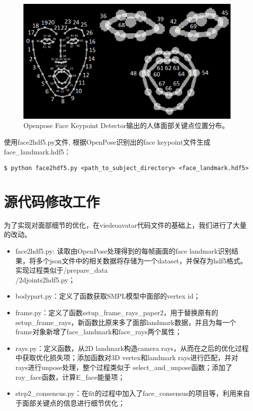 \documentclass{article}
\begin{document}
\begin{figure}
	\centering
	\includegraphics[width=14cm]{figure/openpose_face}	
	\caption{Openpose Face Keypoint Detector输出的人体面部关键点位置分布。}
	\label{openposeface}
\end{figure}

使用face2hdf5.py文件, 根据OpenPose识别出的face keypoint文件生成face\_landmark.hdf5：

\begin{lstlisting}
$ python face2hdf5.py <path_to_subject_directory> <face_landmark.hdf5>
\end{lstlisting}

\chapter{源代码修改工作}
为了实现对面部细节的优化，在viedeoavatar代码文件的基础上，我们进行了大量的改动。

\begin{itemize}
	\item face2hdf5.py: 读取由OpenPose处理得到的每帧画面的face landmark识别结果，将多个json文件中的相关数据将存储为一个dataset，并保存为hdf5格式。实现过程类似于/prepare\_data\\/2djoints2hdf5.py；
	\item bodypart.py：定义了函数获取SMPL模型中面部的vertex id；
	\item frame.py：定义了函数setup\_frame\_rays\_paper2，用于替换原有的setup\_frame\_rays，新函数比原来多了面部landmark数据，并且为每一个frame对象新增了face\_landmark和face\_rays两个属性；
	\item rays.py：定义函数，从2D landmark构造camera rays，从而在之后的优化过程中获取优化损失项；添加函数对3D vertex和landmark rays进行匹配，并对rays进行unpose处理，整个过程类似于 select\_and\_unpose函数；添加了ray\_face函数，计算E\_face能量项；
	\item step2\_consencus.py：在fit的过程中加入了face\_consensus的项目等，利用来自于面部关键点的信息进行细节优化；
\end{itemize}
\end{document}
